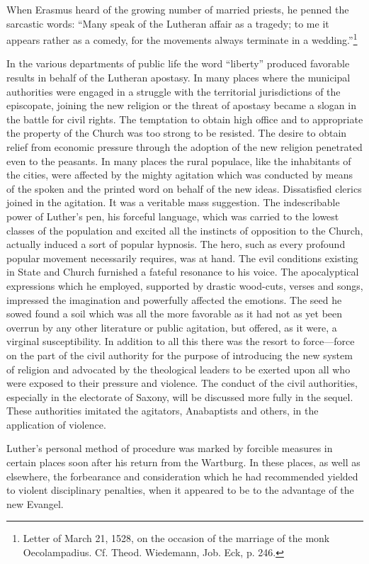 When Erasmus heard of the growing number of married priests,
he penned the sarcastic words: “Many speak of the Lutheran affair
as a tragedy; to me it appears rather as a comedy, for the movements
always terminate in a wedding.”\footnote
{Letter of March 21, 1528, on the occasion of the marriage of the monk Oecolampadius.
Cf. Theod. Wiedemann, Job. Eck, p. 246.}

In the various departments of public life the word “liberty” produced favorable
results in behalf of the Lutheran apostasy. In many
places where the municipal authorities were engaged in a struggle with
the territorial jurisdictions of the episcopate, joining the new religion
or the threat of apostasy became a slogan in the battle for civil rights.
The temptation to obtain high office and to appropriate the property
of the Church was too strong to be resisted. The desire to obtain relief
from economic pressure through the adoption of the new religion penetrated
even to the peasants. In many places the rural populace,
like the inhabitants of the cities, were affected by the mighty
agitation which was conducted by means of the spoken and the
printed word on behalf of the new ideas. Dissatisfied clerics joined in
the agitation. It was a veritable mass suggestion. The indescribable
power of Luther’s pen, his forceful language, which was carried to
the lowest classes of the population and excited all the instincts of
opposition to the Church, actually induced a sort of popular hypnosis.
The hero, such as every profound popular movement necessarily requires,
was at hand. The evil conditions existing in State and
Church furnished a fateful resonance to his voice. The apocalyptical
expressions which he employed, supported by drastic wood-cuts,
verses and songs, impressed the imagination and powerfully affected
the emotions. The seed he sowed found a soil which was all the more
favorable as it had not as yet been overrun by any other literature or
public agitation, but offered, as it were, a virginal susceptibility.
In addition to all this there was the resort to force—force on
the part of the civil authority for the purpose of introducing the new
system of religion and advocated by the theological leaders to be
exerted upon all who were exposed to their pressure and violence.
The conduct of the civil authorities, especially in the electorate of
Saxony, will be discussed more fully in the sequel. These authorities
imitated the agitators, Anabaptists and others, in the application of
violence.

Luther’s personal method of procedure was marked by forcible
measures in certain places soon after his return from the Wartburg.
In these places, as well as elsewhere, the forbearance and consideration
which he had recommended yielded to violent disciplinary penalties,
when it appeared to be to the advantage of the new Evangel.

